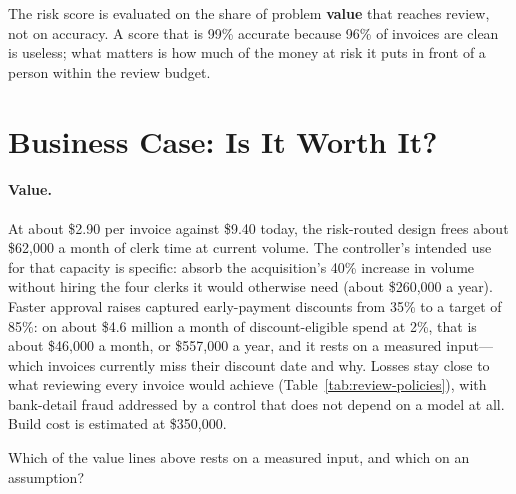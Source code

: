 The risk score is evaluated on the share of problem \textbf{value} that reaches review, not on accuracy. A score that is 99\% accurate because 96\% of invoices are clean is useless; what matters is how much of the money at risk it puts in front of a person within the review budget.

\section{Business Case: Is It Worth It?}
\label{sec:inv-business}

\paragraph{Value.} At about \$2.90 per invoice against \$9.40 today, the risk-routed design frees about \$62{,}000 a month of clerk time at current volume. The controller's intended use for that capacity is specific: absorb the acquisition's 40\% increase in volume without hiring the four clerks it would otherwise need (about \$260{,}000 a year). Faster approval raises captured early-payment discounts from 35\% to a target of 85\%: on about \$4.6 million a month of discount-eligible spend at 2\%, that is about \$46{,}000 a month, or \$557{,}000 a year, and it rests on a measured input---which invoices currently miss their discount date and why. Losses stay close to what reviewing every invoice would achieve (Table~\ref{tab:review-policies}), with bank-detail fraud addressed by a control that does not depend on a model at all. Build cost is estimated at \$350{,}000.

\begin{quickcheck}
Which of the value lines above rests on a measured input, and which on an assumption?
\end{quickcheck}

